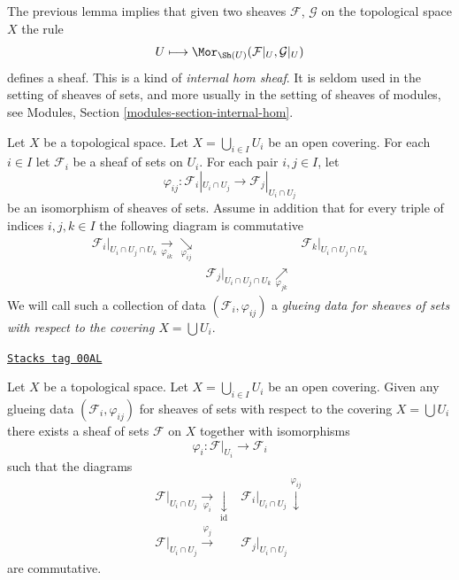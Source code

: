 The previous lemma implies that given two sheaves $\mathcal{F}$,
$\mathcal{G}$ on the topological space $X$ the rule
$$
U \longmapsto
\Mor_{\Sh(U)}(
\mathcal{F}|_U, \mathcal{G}|_U)
$$
defines a sheaf. This is a kind of {\it internal hom sheaf}. It is
seldom used in the setting of sheaves of sets, and more usually
in the setting of sheaves of modules, see
Modules, Section \ref{modules-section-internal-hom}.

\medskip\noindent
Let $X$ be a topological space.
Let $X = \bigcup_{i\in I} U_i$ be an open covering.
For each $i \in I$ let $\mathcal{F}_i$ be a sheaf of sets on $U_i$.
For each pair $i, j \in I$, let
$$
\varphi_{ij} :
\mathcal{F}_i|_{U_i \cap U_j}
\longrightarrow
\mathcal{F}_j|_{U_i \cap U_j}
$$
be an isomorphism of sheaves of sets. Assume in addition
that for every triple of indices $i, j, k \in I$ the
following diagram is commutative
$$
\begin{array}{ccc}\mathcal{F}_i|_{U_i \cap U_j \cap U_k}
\underset{\varphi_{ik}}{\longrightarrow}\underset{\varphi_{ij}}{\searrow} &  & \mathcal{F}_k|_{U_i \cap U_j \cap U_k} \\  & \mathcal{F}_j|_{U_i \cap U_j \cap U_k}
\underset{\varphi_{jk}}{\nearrow} & \end{array}
$$
We will call such a collection of data
$(\mathcal{F}_i, \varphi_{ij})$
a {\it glueing data for sheaves of sets with respect to
the covering $X = \bigcup U_i$}.

\begin{lemma}
\label{sheaves-lemma-glue-sheaves}
\href{https://stacks.math.columbia.edu/tag/00AL}{\texttt{Stacks tag 00AL}}

Let $X$ be a topological space.
Let $X = \bigcup_{i\in I} U_i$ be an open covering.
Given any glueing data $(\mathcal{F}_i, \varphi_{ij})$
for sheaves of sets with respect to the covering $X = \bigcup U_i$
there exists a sheaf of sets $\mathcal{F}$ on $X$
together with isomorphisms
$$
\varphi_i : \mathcal{F}|_{U_i} \to \mathcal{F}_i
$$
such that the diagrams
$$
\begin{array}{cc}\mathcal{F}|_{U_i \cap U_j} \underset{\varphi_i}{\longrightarrow}\underset{\text{id}}{\downarrow} & \mathcal{F}_i|_{U_i \cap U_j} \overset{\varphi_{ij}}{\downarrow} \\ \mathcal{F}|_{U_i \cap U_j} \overset{\varphi_j}{\longrightarrow} & \mathcal{F}_j|_{U_i \cap U_j}\end{array}
$$
are commutative.
\end{lemma}

